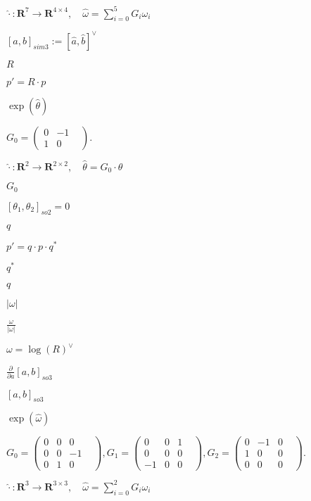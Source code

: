 \documentclass{article}
\begin{document}
$ \widehat{\cdot}: \mathbf{R}^7 \rightarrow \mathbf{R}^{4\times 4}, \quad \widehat{\omega} = \sum_{i=0}^5 G_i \omega_i $
\pagebreak

$ [a, b]_{sim3} := [\widehat{a}, \widehat{b}]^\vee $
\pagebreak

$R$
\pagebreak

$ p' = R\cdot p $
\pagebreak

$ \exp(\widehat{\theta}) $
\pagebreak

$ G_0 = \left( \begin{array}{ccc} 0& -1& \\ 1& 0& \end{array} \right). $
\pagebreak

$ \widehat{\cdot}: \mathbf{R}^2 \rightarrow \mathbf{R}^{2\times 2}, \quad \widehat{\theta} = G_0\cdot \theta $
\pagebreak

$ G_0 $
\pagebreak

$ [\theta_1, \theta_2]_{so2} = 0 $
\pagebreak

$q$
\pagebreak

$ p' = q\cdot p \cdot q^{*} $
\pagebreak

$ q^{*} $
\pagebreak

$ q $
\pagebreak

$|\omega|$
\pagebreak

$\frac{\omega}{|\omega|}$
\pagebreak

$ \omega = \log(R)^\vee $
\pagebreak

$ \frac{\partial}{\partial a} [a, b]_{so3} $
\pagebreak

$ [a, b]_{so3} $
\pagebreak

$ \exp(\widehat{\omega}) $
\pagebreak

$ G_0 = \left( \begin{array}{ccc} 0& 0& 0& \\ 0& 0& -1& \\ 0& 1& 0& \end{array} \right), G_1 = \left( \begin{array}{ccc} 0& 0& 1& \\ 0& 0& 0& \\ -1& 0& 0& \end{array} \right), G_2 = \left( \begin{array}{ccc} 0& -1& 0& \\ 1& 0& 0& \\ 0& 0& 0& \end{array} \right). $
\pagebreak

$ \widehat{\cdot}: \mathbf{R}^3 \rightarrow \mathbf{R}^{3\times 3}, \quad \widehat{\omega} = \sum_{i=0}^2 G_i \omega_i $
\pagebreak
\end{document}
